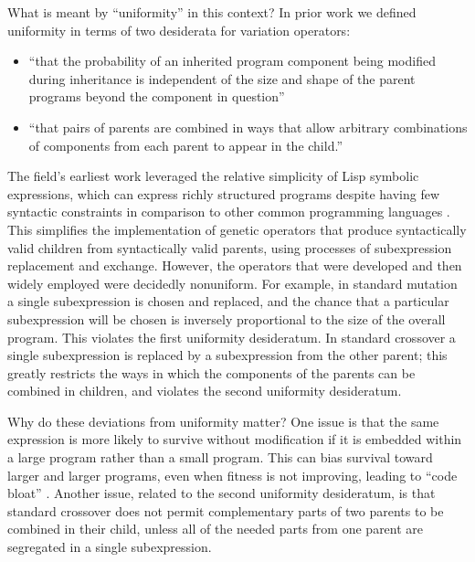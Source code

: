 What is meant by ``uniformity'' in this context? In prior work \citep{Spector:2013:GPTP} we defined uniformity in terms of two desiderata for variation operators:

\begin{itemize}
\item ``that the probability of an inherited program component being modified during inheritance is independent of the size and shape of the parent programs beyond the component in question'' 
\item ``that pairs of parents are combined in ways that allow arbitrary combinations of components from each parent to appear in the child.''
\end{itemize}

The field's earliest work leveraged the relative simplicity of Lisp symbolic expressions, which can express richly structured programs despite having few syntactic constraints in comparison to other common programming languages \citep{koza:book}. This simplifies the implementation of genetic operators that produce syntactically valid children from syntactically valid parents, using processes of subexpression replacement and exchange. However, the operators that were developed and then widely employed were decidedly nonuniform. For example, in standard mutation a single subexpression is chosen and replaced, and the chance that a particular subexpression will be chosen is inversely proportional to the size of the overall program. This violates the first uniformity desideratum. In standard crossover a single subexpression is replaced by a subexpression from the other parent; this greatly restricts the ways in which the components of the parents can be combined in children, and violates the second uniformity desideratum.

Why do these deviations from uniformity matter? One issue is that the same expression is more likely to survive without modification if it is embedded within a large program rather than a small program. This can bias survival toward larger and larger programs, even when fitness is not improving, leading to ``code bloat'' \citep{Luke:2006:EC:FIXED}. Another issue, related to the second uniformity desideratum, is that standard crossover does not permit complementary parts of two parents to be combined in their child, unless all of the needed parts from one parent are segregated in a single subexpression.

